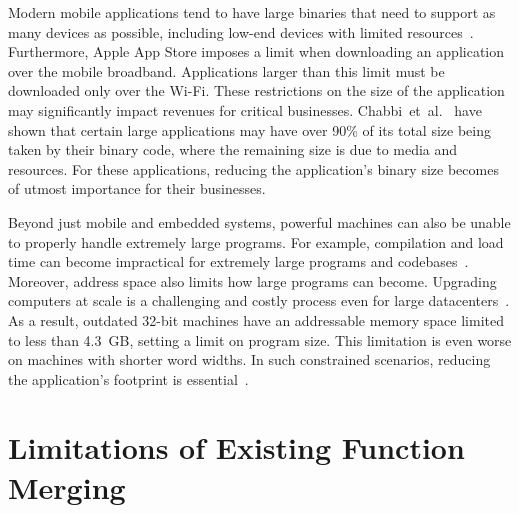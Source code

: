 Modern mobile applications tend to have large binaries that need to support as many devices as possible, including low-end devices with limited resources~\cite{hart02,etzo10}.
Furthermore, Apple App Store imposes a limit when downloading an application over the mobile broadband.
Applications larger than this limit must be downloaded only over the Wi-Fi.
These restrictions on the size of the application may significantly impact revenues for critical businesses.
Chabbi~et~al.~\cite{chabbi21} have shown that certain large applications may have over 90\%
of its total size being taken by their binary code, where the remaining size is due to media and resources.
For these applications, reducing the application's binary size becomes of utmost importance for their businesses.

Beyond just mobile and embedded systems, powerful machines can also be unable to properly handle extremely large programs.
For example, compilation and load time can become impractical for extremely large programs and codebases~\cite{haas17,jaspan18}.
Moreover, address space also limits how large programs can become.
Upgrading computers at scale is a challenging and costly process even for large datacenters~\cite{yan16,neamtiu11}.
As a result, outdated 32-bit machines have an addressable memory space limited to less than 4.3~GB, setting a limit on program size.
This limitation is even worse on machines with shorter word widths.
In such constrained scenarios, reducing the application's footprint is essential~\cite{schultz03,varma04,sehgal12,keoh14,auler17}.

\section{Limitations of Existing Function Merging}

